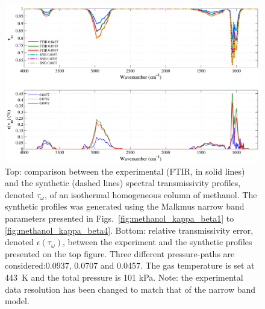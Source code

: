 \begin{figure}[p]
\includegraphics[width=\textwidth]{Figures/Comparison_Fit_Methanol_MALKMUS_Temp443K.pdf}
\caption{Top: comparison between the experimental (FTIR, in solid lines) and the synthetic (dashed lines) spectral transmissivity profiles, denoted $\tau_{\omega}$, of an isothermal homogeneous column of methanol. The synthetic profiles was generated using the Malkmus narrow band parameters presented in Figs.~\ref{fig:methanol_kappa_beta1} to \ref{fig:methanol_kappa_beta4}. Bottom: relative transmissivity error, denoted $\epsilon{(\tau_{\omega})}$, between the experiment and the synthetic profiles presented on the top figure. Three different pressure-paths are considered:0.0937, 0.0707 and 0.0457. The gas temperature is set at 443~K and the total pressure is 101 kPa. Note: the experimental data resolution has been changed to match that of the narrow band model. \label{fig:methanol_SNBVerify_443K}}
\end{figure}

